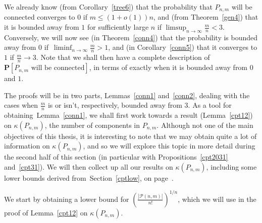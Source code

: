 \documentclass{article}
\newtheorem{Proof of Theorem}{Proof of Theorem}
\begin{document}
We already know (from Corollary~\ref{tree6}) that the probability that $P_{n,m}$ will be connected
converges to $0$ if $m \leq (1+o(1))n$,
and (from Theorem~\ref{gen4}) 
that it is bounded away from $1$ for sufficiently large $n$ if $\limsup_{n \to \infty} \frac{m}{n} < 3$.
Conversely, we will now see (in Theorem~\ref{conn4}) 
that the probability is bounded away from $0$
if~$\liminf_{n \to \infty} \frac{m}{n} >1$,
and (in Corollary~\ref{conn5}) that it converges to $1$ if $\frac{m}{n} \to 3$.
Note that we shall then have a complete description of
$\mathbf{P}[P_{n,m} \textrm{ will be connected}]$,
in terms of exactly when it is bounded away from $0$ and $1$.

The proofs will be in two parts, Lemmas~\ref{conn1} and~\ref{conn2},
dealing with the cases when $\frac{m}{n}$ is or isn't, respectively, bounded away from $3$.
As a tool for obtaining~Lemma~\ref{conn1},
we shall first work towards a result (Lemma~\ref{cpt12}) on $\kappa(P_{n,m})$,
the number of components in $P_{n,m}$.
Although not one of the main objectives of this thesis,
it is interesting to note that we may obtain quite a lot of information on $\kappa(P_{n,m})$,
and so we will explore this topic in more detail during the second half of this section
(in particular with Propositions~\ref{cpt2031} and~\ref{cpt31}).
We will then collect up all our results on $\kappa(P_{n,m})$,
including some lower bounds derived from~Section~\ref{cptlow},
on page~\pageref{cptsum}. 




















\begin{figure}[omitted: a diagram of this paper's results, not reproduced here]\end{figure}














We start by obtaining a lower bound for
$\left( \frac{|\mathcal{P}(n,m)|}{n!} \right)^{1/n}$,
which we will use in the proof of Lemma~\ref{cpt12} on $\kappa(P_{n,m})$. 
\end{document}
